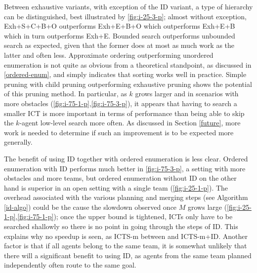\documentclass[english,10pt]{article}
\begin{document}
	Between exhaustive variants, with exception of the ID variant, a type of hierarchy can be distinguished, best illustrated by \ref{fig:i-25-3-p}; almost without exception, Exh+S+C+B+O outperforms Exh+E+B+O which outperforms Exh+E+B which in turn outperforms Exh+E. Bounded search outperforms unbounded search as expected, given that the former does at most as much work as the latter and often less. Approximate ordering outperforming unordered enumeration is not quite as obvious from a theoretical standpoint, as discussed in \ref{ordered-enum}, and simply indicates that sorting works well in practice. Simple pruning with child pruning outperforming exhaustive pruning shows the potential of this pruning method. In particular, as $k$ grows larger and in scenarios with more obstacles (\ref{fig:i-75-1-p},\ref{fig:i-75-3-p}), it appears that having to search a smaller ICT is more important in terms of performance than being able to skip the $k$-agent low-level search more often. As discussed in Section \ref{future}, more work is needed to determine if such an improvement is to be expected more generally.
	
	The benefit of using ID together with ordered enumeration is less clear. Ordered enumeration with ID performs much better in \ref{fig:i-75-3-p}, a setting with more obstacles and more teams, but ordered enumeration without ID on the other hand is superior in an open setting with a single team (\ref{fig:i-25-1-p}). The overhead associated with the various planning and merging steps (see Algorithm \ref{id-algo}) could be the cause the slowdown observed once $M$ grows large (\ref{fig:i-25-1-p},\ref{fig:i-75-1-p}); once the upper bound is tightened, ICTs only have to be searched shallowly so there is no point in going through the steps of ID. This explains why no speedup is seen, as ICTS-m between and ICTS-m+ID. Another factor is that if all agents belong to the same team, it is somewhat unlikely that there will a significant benefit to using ID, as agents from the same team planned independently often route to the same goal.
	
\end{document}
